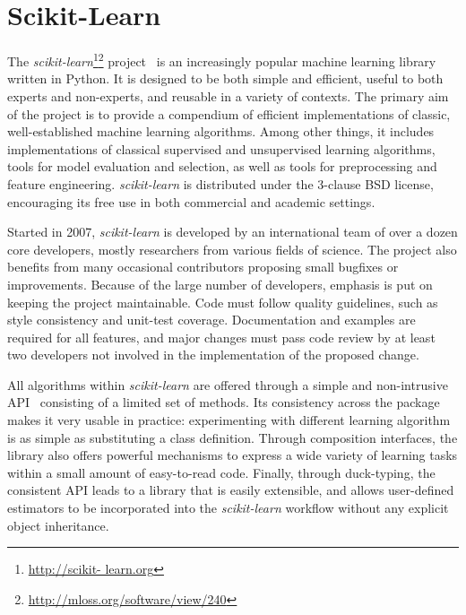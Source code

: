 \documentclass{article}
\newcommand{\sklearn}{\textit{scikit-learn}\xspace}
\begin{document}

\section*{Scikit-Learn}

The \sklearn\footnote{\url{http://scikit-
learn.org}}\footnote{\url{http://mloss.org/software/view/240}}
project~\citep{pedregosa2011} is an increasingly popular machine learning
library written in Python.  It is designed to be both  simple and efficient,
useful to both experts and non-experts, and reusable in a variety of contexts.
The  primary aim of the project is to provide a compendium of efficient
implementations of classic, well-established  machine learning algorithms.
Among other things, it includes implementations of classical supervised and
unsupervised learning algorithms, tools for model evaluation and selection, as
well as tools for preprocessing and feature engineering. \sklearn is
distributed under the 3-clause  BSD license, encouraging its free use in both
commercial and academic settings.

Started in 2007, \sklearn is developed by an international team of over a dozen
core developers, mostly researchers from various fields of science. The project
also benefits from many occasional contributors proposing small bugfixes or
improvements. Because of the large number of developers, emphasis is put on
keeping the project maintainable. Code must follow quality guidelines, such as
style consistency and unit-test coverage. Documentation and examples are
required for all features, and major changes must pass code review by at least
two developers not involved in the implementation of the proposed change.

All algorithms within \sklearn are offered through a simple and non-intrusive
API~\citep{buitinck2013api} consisting of a limited set of methods. Its
consistency across the package makes it very usable in practice: experimenting
with different learning algorithm is as simple as substituting a class
definition. Through composition interfaces, the library also offers powerful
mechanisms to express a wide variety of learning tasks within a small amount of
easy-to-read code. Finally, through duck-typing, the consistent API leads to a
library that is easily extensible, and allows user-defined estimators to be
incorporated into the \sklearn workflow without any explicit object
inheritance. %
\end{document}

